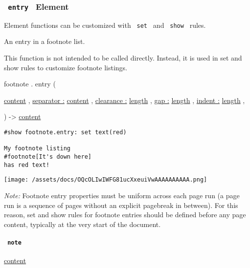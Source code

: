 \subsubsection{\texorpdfstring{\texttt{\ entry\ } {{ Element
}}}{ entry   Element }}\label{definitions-entry}

\label{definitions-entry-element-tooltip}
Element functions can be customized with \texttt{\ set\ } and
\texttt{\ show\ } rules.

An entry in a footnote list.

This function is not intended to be called directly. Instead, it is used
in set and show rules to customize footnote listings.

footnote { . } { entry } (

{ \href{/docs/reference/foundations/content/}{content} , } {
\hyperref[definitions-entry-parameters-separator]{separator :}
\href{/docs/reference/foundations/content/}{content} , } {
\hyperref[definitions-entry-parameters-clearance]{clearance :}
\href{/docs/reference/layout/length/}{length} , } {
\hyperref[definitions-entry-parameters-gap]{gap :}
\href{/docs/reference/layout/length/}{length} , } {
\hyperref[definitions-entry-parameters-indent]{indent :}
\href{/docs/reference/layout/length/}{length} , }

) -\textgreater{} \href{/docs/reference/foundations/content/}{content}

\begin{verbatim}
#show footnote.entry: set text(red)

My footnote listing
#footnote[It's down here]
has red text!
\end{verbatim}

\texttt{[image: /assets/docs/OQcOLIwIWFG81ucXxeuiVwAAAAAAAAAA.png]}

\emph{Note:} Footnote entry properties must be uniform across each page
run (a page run is a sequence of pages without an explicit pagebreak in
between). For this reason, set and show rules for footnote entries
should be defined before any page content, typically at the very start
of the document.

\paragraph{\texorpdfstring{\texttt{\ note\ }}{ note }}\label{definitions-entry-note}

\href{/docs/reference/foundations/content/}{content}

